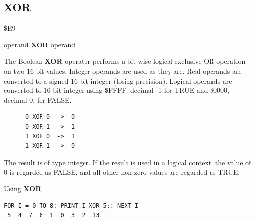\subsection{XOR}
\begin{description}[leftmargin=2cm,style=nextline]
\item [Token:] \$E9
\item [Format:] operand {\bf XOR} operand
\item [Usage:]  The Boolean {\bf XOR} operator performs a bit-wise
                logical exclusive OR operation on two 16-bit values.
                Integer operands are used as they are.
                Real operands are converted to a signed 16-bit integer (losing precision).
                Logical operands are converted to 16-bit integer
                using \$FFFF, decimal -1 for TRUE
                and \$0000, decimal 0, for FALSE.

   \begin{verbatim}
      0 XOR 0  ->  0
      0 XOR 1  ->  1
      1 XOR 0  ->  1
      1 XOR 1  ->  0
   \end{verbatim}

\item [Remarks:] The result is of type integer.
                 If the result is used in a logical context,
                 the value of 0 is regarded as FALSE, and
                 all other non-zero values are regarded as TRUE.
\item [Example:] Using {\bf XOR}

\begin{tcolorbox}[colback=black,coltext=white]
\verbatimfont{\codefont}
\begin{verbatim}
FOR I = 0 TO 8: PRINT I XOR 5;: NEXT I
 5  4  7  6  1  0  3  2  13
\end{verbatim}
\end{tcolorbox}
\end{description}

